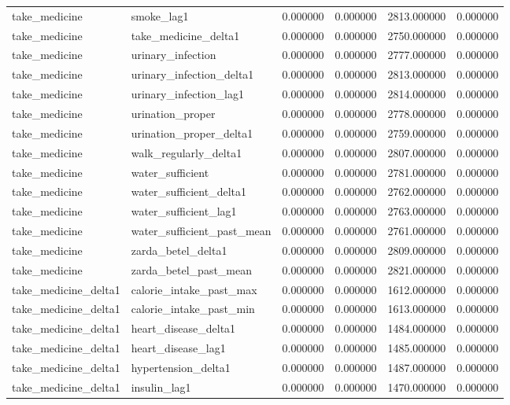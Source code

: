 \begin{longtable}{llrrrr}
take\_medicine & smoke\_lag1 & 0.000000 & 0.000000 & 2813.000000 & 0.000000 \\
take\_medicine & take\_medicine\_delta1 & 0.000000 & 0.000000 & 2750.000000 & 0.000000 \\
take\_medicine & urinary\_infection & 0.000000 & 0.000000 & 2777.000000 & 0.000000 \\
take\_medicine & urinary\_infection\_delta1 & 0.000000 & 0.000000 & 2813.000000 & 0.000000 \\
take\_medicine & urinary\_infection\_lag1 & 0.000000 & 0.000000 & 2814.000000 & 0.000000 \\
take\_medicine & urination\_proper & 0.000000 & 0.000000 & 2778.000000 & 0.000000 \\
take\_medicine & urination\_proper\_delta1 & 0.000000 & 0.000000 & 2759.000000 & 0.000000 \\
take\_medicine & walk\_regularly\_delta1 & 0.000000 & 0.000000 & 2807.000000 & 0.000000 \\
take\_medicine & water\_sufficient & 0.000000 & 0.000000 & 2781.000000 & 0.000000 \\
take\_medicine & water\_sufficient\_delta1 & 0.000000 & 0.000000 & 2762.000000 & 0.000000 \\
take\_medicine & water\_sufficient\_lag1 & 0.000000 & 0.000000 & 2763.000000 & 0.000000 \\
take\_medicine & water\_sufficient\_past\_mean & 0.000000 & 0.000000 & 2761.000000 & 0.000000 \\
take\_medicine & zarda\_betel\_delta1 & 0.000000 & 0.000000 & 2809.000000 & 0.000000 \\
take\_medicine & zarda\_betel\_past\_mean & 0.000000 & 0.000000 & 2821.000000 & 0.000000 \\
take\_medicine\_delta1 & calorie\_intake\_past\_max & 0.000000 & 0.000000 & 1612.000000 & 0.000000 \\
take\_medicine\_delta1 & calorie\_intake\_past\_min & 0.000000 & 0.000000 & 1613.000000 & 0.000000 \\
take\_medicine\_delta1 & heart\_disease\_delta1 & 0.000000 & 0.000000 & 1484.000000 & 0.000000 \\
take\_medicine\_delta1 & heart\_disease\_lag1 & 0.000000 & 0.000000 & 1485.000000 & 0.000000 \\
take\_medicine\_delta1 & hypertension\_delta1 & 0.000000 & 0.000000 & 1487.000000 & 0.000000 \\
take\_medicine\_delta1 & insulin\_lag1 & 0.000000 & 0.000000 & 1470.000000 & 0.000000 \\

\end{longtable}
